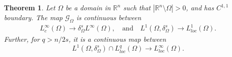 \documentclass{amsart}
\newtheorem{theorem}{Theorem}[section]
\newcommand{\R}{\mathbb{R}}
\newcommand{\g}[1]{\mathcal{G}_{#1}}
\begin{document}
\begin{theorem}\label{theorem greens poteantial continuity on unbounded domains}
    Let $\Omega$ be a domain in $\R^{n}$ such that $|\R^{n}\setminus \Omega|>0$, and has $C^{1,1}$ boundary. The map $\g{\Omega}$ is continuous between
    \begin{equation*}
    \begin{split}
        L^{\infty}_{c}(\Omega)\to \delta_{\Omega}^{s}L^{\infty}(\Omega),\quad \text{and} \quad L^{1}(\Omega,\delta_{\Omega}^{s})\to L_{loc}^{1}(\Omega). 
    \end{split}    
    \end{equation*}
Further, for $q>n/2s$, it is a continuous map between 
\begin{equation*}
    L^{1}(\Omega,\delta_{\Omega}^{s})\cap L_{loc}^{q}(\Omega)\to L^{\infty}_{loc}(\Omega).
\end{equation*}
\end{theorem}
\end{document}
